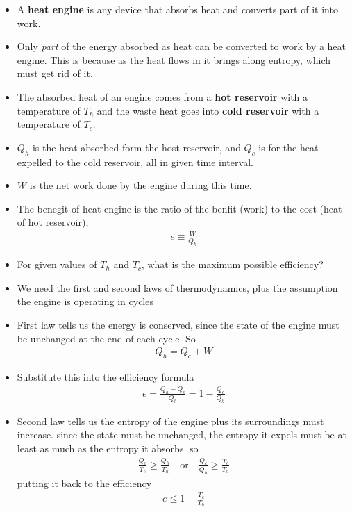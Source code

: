 \documentclass{book}
\begin{document}
\begin{itemize}
	\item A \textbf{heat engine} is any device that absorbs heat and converts part of it into work.
	\item Only \textit{part} of the energy absorbed as heat can be converted to work by a heat engine. This is
	      because as the heat flows in it brings along entropy, which must get rid of it.
	\item The absorbed heat of an engine comes from a \textbf{hot reservoir} with a temperature of $T_{h}$
	      and the waste heat goes into \textbf{cold reservoir} with a temperature of $T_{c}$.
	\item $Q_{h}$ is the heat absorbed form the host reservoir, and $Q_{c}$ is for the heat expelled to the cold
	      reservoir, all in given time interval.
	\item $W$ is the net work done by the engine during this time.
	\item The benegit of heat engine is the ratio of the benfit (work) to the cost (heat of hot
	      reservoir),
	      \begin{align}
		      e \equiv \frac{W}{Q_{h}}
	      \end{align}
	\item For given values of $ T_h $ and $ T_c $, what is the maximum possible efficiency?
	\item We need the first and second laws of thermodynamics, plus the assumption the engine is operating
	      in cycles
	\item First law tells us the energy is conserved, since the state of the engine must be unchanged at the end
	      of each cycle. So
	      \begin{align}
		      Q_{h} = Q_{c} + W
	      \end{align}
	\item Substitute this into the efficiency formula
	      \begin{align}
		      e = \frac{Q_{h} - Q_{c}}{Q_{h}} = 1 - \frac{Q_{c}}{Q_{h}}
	      \end{align}
	\item Second law tells us the entropy of the engine plus its surroundings must increase.
	      since the state must be unchanged, the entropy it expels must be at least as much as the
	      entropy it absorbs. so
	      \begin{align}
		      \frac{Q_{c}}{T_{c}} \ge \frac{Q_{h}}{T_{h}} \quad \text{or} \quad
		      \frac{Q_{c}}{Q_{h}} \ge \frac{T_{c}}{T_{h}}
	      \end{align}
	      putting it back to the efficiency
	      \begin{align}
		      e \le 1- \frac{T_{c}}{T_{h}}
	      \end{align}


\end{itemize}
\end{document}
